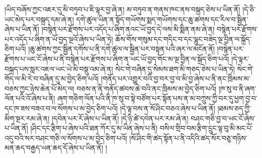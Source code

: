 །ཡིད་བཞོས་ཀྱང་འཇར་དུ་མི་བཏུབ་པ་ཇི་ལྟར་བྱ་ཞེ་ན། མ་བཏུབ་ན་གནས་ཁང་ནས་བསྐྲད་ཅེས་པ་ཡིན་ནོ། །དེ་ཅི་ཡང་མེད་པར་བསྐྲད་དམ་ཞེ་ན། དགེ་ཚུལ་ཡིན་ན་སྟོད་གཡོགས་སྨད་གཡོགས་དང་ཆུ་ཚགས་དང་རིལ་བ་སྦྱིན་ཞེས་པ་ཡིན་ནོ། །བསྙེན་པར་རྫོགས་པར་འདོད་པ་ཞིག་ནའང་ཡོ་བྱད་དེ་ལས་མི་སྨིན་ནམ་ཞེ་ན། བསྙེན་པར་རྫོགས་པར་འདོད་པ་ཞིག་ན་ཡོ་བྱད་ལྔའོ་ཞེས་པ་ཡིན་ཏེ། ཆོས་གོས་གསུམ་དང་གདིང་བ་དང་ལྷུང་བཟེད་ལྔ་བྱིན་ལ་སྐྲོད་ཅིག་པའོ། །ཆུ་ཚགས་ཀྱང་སྦྱིན་དགོས་པ་ནི་དགེ་ཚུལ་ལ་སྦྱིན་པར་བསྟན་པའི་ཞར་ལ་མངོན་ནོ། །བསྙེན་པར་རྫོགས་པ་ཡང་ངོ་ཞེས་པ་ནི་བསྙེན་པར་རྫོགས་པ་ཞིག་ན་ཡང་ཡོ་བྱད་གོང་མ་ལྔ་བྱིན་ལ་སྐྲོད་ཅིག་པའོ། །དེ་ལྟར་བསྐྲད་པས་སླར་འཇལ་ཡང་ཡེ་མི་བསྡུ་འམ་ཞེ་ན། སེང་གེ་བཞིན་དུ་སེམས་ཐག་མི་གཅད་ཅེས་པ་ཡིན་ཏེ། སེང་གེ་གོད་ལ་མི་རེ་བ་བཞིན་དུ་མ་བྱེད་ཅིག་པའོ། །གནོད་པར་འགྱུར་བའི་བྱ་བར་བྱ་བ་མི་བྱ་ཞེས་པ་ནི་ནང་ཁྲིམས་མ་བཅས་ཀྱང་ཉེས་ཆེན་པོ་མེད་ལ། བཅས་ན་ནི་གནོད་ཚབས་ཆེ་བའི་ནང་ཁྲིམས་མ་བྱེད་ཅིག་པའོ། །ཁ་སུ་བ་ནི་ཞག་ལོན་པའི་འོ་ཞེས་པ་ནི། ཞག་གཅིག་ལོན་པའི་ནི་ཁ་སུ་བ་སྟེ་བཙོག་པར་སྟོན་པས་ན་མ་བཀྲུས་ཀྱི་བར་དུ་ཕྱག་བྱ་བ་དང་ཁ་ཟས་བཟའ་བ་ལ་སོགས་པ་མ་བྱེད་ཅིག་པའོ། །དེ་ལྟ་བས་ན་སོ་ཤིང་བཅའ་ཞེས་པ་ཡིན་ནོ། །ཐམས་ཅད་ཀྱི་མིག་སྔར་རམ་ཞེ་ན། །དབེན་པར་རོ་ཞེས་པ་ཡིན་ནོ། །དེ་ཉི་ཚེ་དབེན་པར་རམ་ཞེ་ན། བཤང་གཅི་བྱ་བ་ཡང་ངོ་ཞེས་པ་ཡིན་ནོ། །ཤིང་དང་རྩིག་པ་ཞེས་པའི་ཐན་ཀོར་དུ་མ་ཡིན་ཞེས་པ་ནི། བསིལ་གྲིབ་བམ་རྩིག་དྲུང་ལྟ་བུ་མི་མང་པོ་འདུ་བའི་སར་བཤང་གཅི་ལ་སོགས་པ་མ་བྱེད་ཅིག་པའོ། །སོ་ཤིང་གི་ཚད་སྟོན་པ་ནི་འདིའི་ཚད་སོར་བཅུ་གཉིས་མན་ཆད་བརྒྱད་ཡན་ཆད་དོ་ཞེས་པ་ཡིན་ནོ། །
